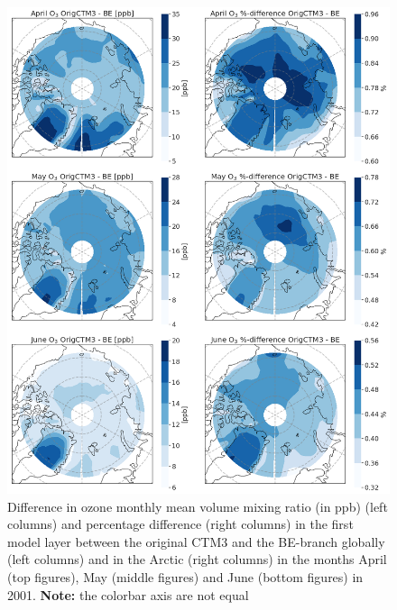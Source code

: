 \begin{figure}[h]
    \centering
    \includegraphics[width = \linewidth]{Chapter6_Results/images/Orig_BE_comp/polar_VMRperc_AprJune_2001.png}
    \caption{Difference in ozone monthly mean volume mixing ratio (in ppb) (left columns) and percentage difference (right columns) in the first model layer between the original CTM3 and the BE-branch globally (left columns) and in the Arctic (right columns) in the months April (top figures), May (middle figures) and June (bottom figures) in 2001. \textbf{Note:} the colorbar axis are not equal}
    \label{fig:BE_origPD_vmrperc_AprJune}
\end{figure}